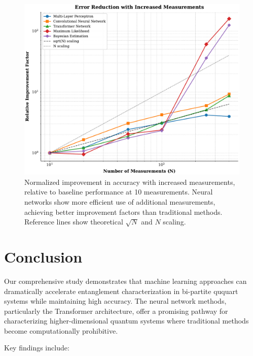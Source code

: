 \documentclass{optica-article}
\begin{document}
\begin{figure}[H]
\centering
\includegraphics[width=\linewidth]{../plots/normalized_improvement.pdf}
\caption{Normalized improvement in accuracy with increased measurements, relative to baseline performance at 10 measurements. Neural networks show more efficient use of additional measurements, achieving better improvement factors than traditional methods. Reference lines show theoretical $\sqrt{N}$ and $N$ scaling.}
\label{fig:improvement}
\end{figure}

\section{Conclusion}

Our comprehensive study demonstrates that machine learning approaches can dramatically accelerate entanglement characterization in bi-partite ququart systems while maintaining high accuracy. The neural network methods, particularly the Transformer architecture, offer a promising pathway for characterizing higher-dimensional quantum systems where traditional methods become computationally prohibitive.

Key findings include:
\end{document}
